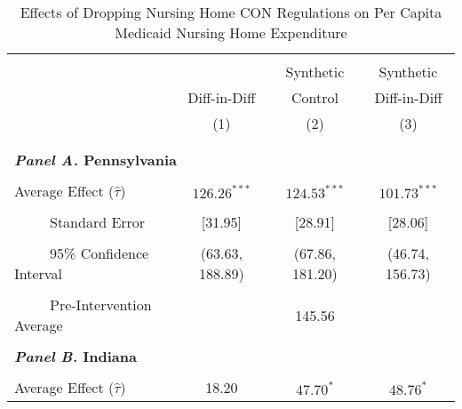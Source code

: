 \documentclass[../Main.tex]{subfiles}
\begin{document}




\newpage
\null
\vfill
\begin{table}[htbp]\centering \footnotesize
\def\sym#1{\ifmmode^{#1}\else\(^{#1}\)\fi}
\captionsetup{width=.8\textwidth}
\caption{\centering Effects of Dropping Nursing Home CON Regulations on Per Capita Medicaid Nursing Home Expenditure}
\label{tab:ave_results_med_exp_nobord_nocov}
\setlength{\tabcolsep}{10pt}
\begin{tabular}{l*{3}{c}}
\hline\hline
\\[-2ex]
&\multicolumn{1}{c}{}&\multicolumn{1}{c}{Synthetic}&\multicolumn{1}{c}{Synthetic}\\
&\multicolumn{1}{c}{Diff-in-Diff}&\multicolumn{1}{c}{Control}&\multicolumn{1}{c}{Diff-in-Diff}\\
&\multicolumn{1}{c}{(1)}&\multicolumn{1}{c}{(2)}&\multicolumn{1}{c}{(3)}\\
\\[-2ex]
\hline
\\[-.1ex]
\multicolumn{4}{l}{\textbf{\textit{Panel A.} Pennsylvania}}\\
\\[-1.5ex]
\multicolumn{1}{l}{Average Effect ($\hat{\tau}$)}&   \multicolumn{1}{c}{$126.26^{***}$}&   \multicolumn{1}{c}{$124.53^{***}$}&  \multicolumn{1}{c}{$101.73^{***}$}\\
\\[-2ex]
\multicolumn{1}{l}{\ \ \ \ \ Standard Error}  &\multicolumn{1}{c}{[31.95]}&\multicolumn{1}{c}{[28.91]}&\multicolumn{1}{c}{[28.06]}\\
\\[-2ex]
\multicolumn{1}{l}{\ \ \ \ \ 95\% Confidence Interval}&   \multicolumn{1}{c}{(63.63, 188.89)}&   \multicolumn{1}{c}{(67.86, 181.20)}&   \multicolumn{1}{c}{(46.74, 156.73)}\\
\\[-2ex]
\multicolumn{1}{l}{\ \ \ \ \ Pre-Intervention Average}&   \multicolumn{3}{c}{145.56}\\
\\[-.1ex]
\multicolumn{4}{l}{\textbf{\textit{Panel B.} Indiana}}\\
\\[-1.5ex]
\multicolumn{1}{l}{Average Effect ($\hat{\tau}$)}&   \multicolumn{1}{c}{18.20}&   \multicolumn{1}{c}{$47.70^{*}$}&  \multicolumn{1}{c}{$48.76^{*}$}\\

\end{tabular}
\end{table}
\end{document}
